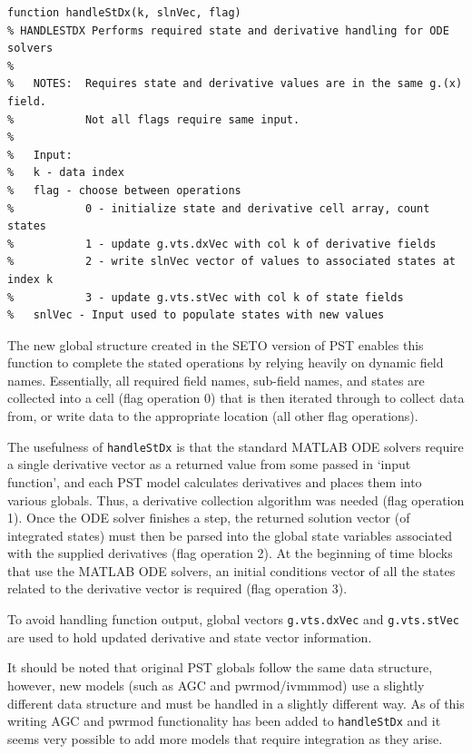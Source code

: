 \begin{verbatim}
function handleStDx(k, slnVec, flag)
% HANDLESTDX Performs required state and derivative handling for ODE solvers
%
%   NOTES:  Requires state and derivative values are in the same g.(x) field.
%           Not all flags require same input.
%
%   Input:
%   k - data index
%   flag - choose between operations
%           0 - initialize state and derivative cell array, count states
%           1 - update g.vts.dxVec with col k of derivative fields
%           2 - write slnVec vector of values to associated states at index k
%           3 - update g.vts.stVec with col k of state fields
%   snlVec - Input used to populate states with new values
\end{verbatim}

The new global structure created in the SETO version of PST enables this function to complete the stated operations by relying heavily on dynamic field names. 
Essentially, all required field names, sub-field names, and states are collected into a cell (flag operation 0) that is then iterated through to collect data from, or write data to the appropriate location (all other flag operations).

The usefulness of \verb|handleStDx| is that the standard MATLAB ODE solvers require a single derivative vector as a returned value from some passed in `input function', and each PST model calculates derivatives and places them into various globals. 
Thus, a derivative collection algorithm was needed (flag operation 1).
Once the ODE solver finishes a step, the returned solution vector (of integrated states) must then be parsed into the global state variables associated with the supplied derivatives (flag operation 2).
At the beginning of time blocks that use the MATLAB ODE solvers, an initial conditions vector of all the states related to the derivative vector is required (flag operation 3).

To avoid handling function output, global vectors \verb|g.vts.dxVec| and \verb|g.vts.stVec| are used to hold updated derivative and state vector information.

It should be noted that original PST globals follow the same data structure,
however, new models (such as AGC and pwrmod/ivmmmod) use a slightly different data structure and must be handled in a slightly different way.
As of this writing AGC and pwrmod functionality has been added to \verb|handleStDx| and it seems very possible to add more models that require integration as they arise.

